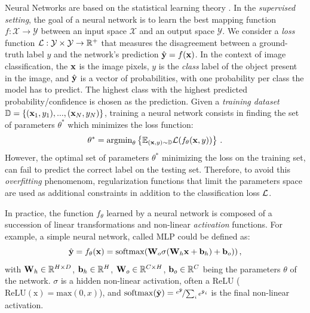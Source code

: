 Neural Networks are based on the statistical learning theory \citep{vapnik1999statstheory}. In the
\textit{supervised setting}, the goal of a neural network is to learn the best mapping function $f :
      \mathcal{X} \rightarrow \mathcal{Y}$ between an input space $\mathcal{X}$ and an output space
$\mathcal{Y}$.  We consider a \textit{loss} function $\mathcal{L} : \mathcal{Y} \times \mathcal{Y} \rightarrow
      \mathbb{R}^+$ that measures the disagreement between a ground-truth label $y$ and the network's
prediction $\hat{\mathbf{y}} = f(\mathbf{x})$. In the context of image classification, the $\mathbf{x}$ is the image
pixels, $y$ is the \textit{class} label of the object present in the image, and $\hat{\mathbf{y}}$ is a
vector of probabilities, with one probability per class the model has to predict. The highest class
with the highest predicted probability/confidence is chosen as the prediction.
Given a \textit{training dataset} $\mathbb{D} = \{(\mathbf{x}_1, y_1), ..., (\mathbf{x}_N, y_N)\}$, training a neural network
consists in finding the set of parameters $\theta^*$ which minimizes the loss function:
%
\begin{equation}
      \theta^* = \operatorname{argmin}_{\theta} \left \{ \mathbb{E}_{(\mathbf{x},y) \sim \mathbb{D}} \mathcal{L}(f_\theta(\mathbf{x}, y))\right \}\,.
      \label{eq:intro_optim}
\end{equation}
%
However, the optimal set of parameters $\theta^*$ minimizing the loss on the training set, can fail
to predict the correct label on the testing set. Therefore, to avoid this \textit{overfitting} phenomenom,
regularization functions that limit the parameters space are used as additional constraints in addition
to the classification loss $\mathcal{L}$.

In practice, the function $f_\theta$ learned by a neural network is composed of a succession of linear
transformations and non-linear \textit{activation} functions. For example, a simple neural network,
called \ac{MLP} could be defined as:
%
\begin{equation}
      \hat{\mathbf{y}} = f_\theta(\mathbf{x}) = \operatorname{softmax}(\mathbf{W}_o \sigma(\mathbf{W}_h \mathbf{x} + \mathbf{b}_h) + \mathbf{b}_o))\,,
      \label{eq:intro_mlp}
\end{equation}
%
\noindent with $\mathbf{W}_h \in \mathbb{R}^{H \times D}$, $\mathbf{b}_h \in \mathbb{R}^{H}$, $\mathbf{W}_o \in
      \mathbb{R}^{C \times H}$, $\mathbf{b}_o \in \mathbb{R}^{C}$ being the parameters $\theta$ of the
network. $\sigma$ is a hidden non-linear activation, often a \ac{ReLU}
($\operatorname{ReLU(x)} = \text{max}(0, x)$), and $\operatorname{softmax}(\tilde{\mathbf{y}}) =
      \nicefrac{e^{\tilde{\mathbf{y}}}}{\sum_{i} e^{\tilde{\mathbf{y}}_i}}$ is the final non-linear activation.

